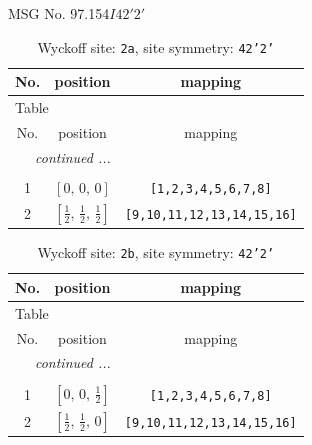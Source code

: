 \documentclass[fleqn,8pt]{jsarticle}
\begin{document}
\setcounter{MaxMatrixCols}{32}

\renewcommand{\tablename}{Table~}
\renewcommand{\figurename}{Figure~}
\begin{center}
\LARGE
MSG No. 97.154\quad$I42'2'$
\end{center}
\renewcommand{\arraystretch}{1.2}
\begin{longtable}{ccc}
\caption{Wyckoff site: {\tt 2a}, site symmetry: {\tt 42'2'}}
 \\
 \hline \hline
No. & position & mapping \\ \hline \endfirsthead

\multicolumn{2}{l}{\tablename\ \thetable{}} \\
 \hline \hline
No. & position & mapping \\ \hline \endhead

 \hline \hline
\multicolumn{2}{r}{\footnotesize\it continued ...} \\ \endfoot

 \hline \hline
\multicolumn{2}{r}{} \\ \endlastfoot

1 & $\left[ 0,\, 0,\, 0 \right]$ & {\tt [1,2,3,4,5,6,7,8]} \\ \hline
2 & $\left[ \frac{1}{2},\, \frac{1}{2},\, \frac{1}{2} \right]$ & {\tt [9,10,11,12,13,14,15,16]} \\
\end{longtable}
\renewcommand{\arraystretch}{1.2}
\begin{longtable}{ccc}
\caption{Wyckoff site: {\tt 2b}, site symmetry: {\tt 42'2'}}
 \\
 \hline \hline
No. & position & mapping \\ \hline \endfirsthead

\multicolumn{2}{l}{\tablename\ \thetable{}} \\
 \hline \hline
No. & position & mapping \\ \hline \endhead

 \hline \hline
\multicolumn{2}{r}{\footnotesize\it continued ...} \\ \endfoot

 \hline \hline
\multicolumn{2}{r}{} \\ \endlastfoot

1 & $\left[ 0,\, 0,\, \frac{1}{2} \right]$ & {\tt [1,2,3,4,5,6,7,8]} \\ \hline
2 & $\left[ \frac{1}{2},\, \frac{1}{2},\, 0 \right]$ & {\tt [9,10,11,12,13,14,15,16]} \\
\end{longtable}
\end{document}
